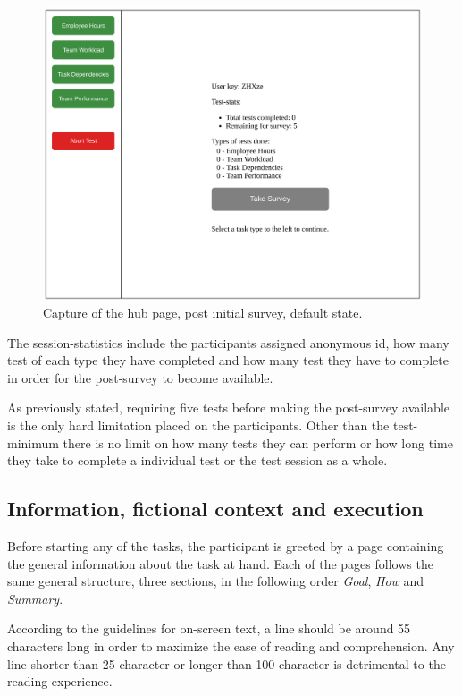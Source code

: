 {  \vspace{-0.2cm}
  \begin{figure}[h!]
    \centering
    \includegraphics[width=.7\textwidth]{figures/captures/webapp_main_statistics.pdf}
    \caption{Capture of the hub page, post initial survey, default state.}
    \label{label_mainStatistics}
  \end{figure}

  The session-statistics include the participants assigned anonymous id,
  how many test of each type they have completed and how many test they
  have to complete in order for the post-survey to become available.

  As previously stated, requiring five tests before making the post-survey
  available is the only hard limitation placed on the participants. Other than
  the test-minimum there is no limit on how many tests they can perform or how
  long time they take to complete a individual test or the test session as a
  whole.

  \subsection{Information, fictional context and execution}

  Before starting any of the tasks, the participant is greeted by a page
  containing the general information about the task at hand. Each of the pages
  follows the same general structure, three sections, in the following order
  \textit{Goal}, \textit{How} and \textit{Summary}.

  According to the guidelines for on-screen
  text\cite{citeOptimalLineLengthinReadingALiteratureReview}, a line should be
  around 55 characters long in order to maximize the ease of reading and
  comprehension. Any line shorter than 25 character or longer than 100
  character is detrimental to the reading experience.

}
